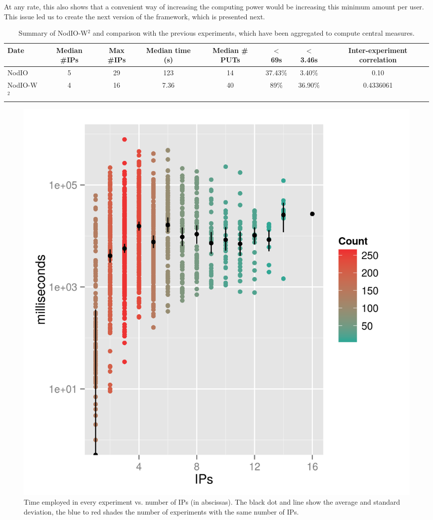 \documentclass{sig-alternate}
\begin{document}
At any rate, this also shows that a convenient way of increasing the
computing power would be increasing this minimum amount per user. This
issue led us to create the next version of the framework, which is
presented next. %

\begin{table}[!htb]
\caption{Summary of {\sf NodIO-W$^2$} and comparison with the previous
  experiments, which have been aggregated to compute central measures. \label{tab:summary:ww}}
\begin{center}
\begin{tabular}{l|ccccccc}
\hline
Date & Median \#IPs & Max \#IPs & Median time (s) & Median \# PUTs & $<$ 69s & $<$ 3.46s & Inter-experiment correlation\\
\hline
{\sf NodIO} & 5 & 29 & 123 & 14 & 37.43\% & 3.40\% & 0.10 \\
{\sf NodIO-W$^2$} & 4  & 16 & 7.36 & 40 & 89\% & 36.90\% & 0.4336061 \\
\hline
\end{tabular}
\end{center}
\end{table}
%
\begin{figure}[!htb]
\centering
\includegraphics[width=0.9\linewidth]{ips-time-ww.png}
\caption{Time employed in every experiment vs. number of IPs (in
  abscissas). The black dot and line show the average and standard
  deviation, the blue to red shades the number of experiments with the same
  number of IPs. } 
\label{fig:ipstime:w2}
\end{figure}
\end{document}

